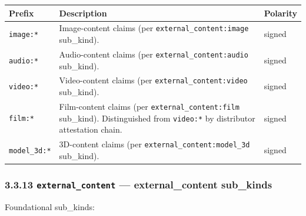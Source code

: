 \documentclass[11pt]{article}
\begin{document}
{\footnotesize
\begin{longtable}{|p{5.33cm}|p{5.33cm}|p{5.33cm}|}\hline
\textbf{Prefix} & \textbf{Description} & \textbf{Polarity} \\ \hline\endhead
\texttt{image:*} & Image-content claims (per \texttt{external\_content:image} sub\_kind). & signed \\ \hline
\texttt{audio:*} & Audio-content claims (per \texttt{external\_content:audio} sub\_kind). & signed \\ \hline
\texttt{video:*} & Video-content claims (per \texttt{external\_content:video} sub\_kind). & signed \\ \hline
\texttt{film:*} & Film-content claims (per \texttt{external\_content:film} sub\_kind). Distinguished from \texttt{video:*} by distributor attestation chain. & signed \\ \hline
\texttt{model\_3d:*} & 3D-content claims (per \texttt{external\_content:model\_3d} sub\_kind). & signed \\ \hline
\end{longtable}}


\subsubsection*{3.3.13 \texttt{external\_content} — external\_content sub\_kinds}


Foundational sub\_kinds:
\end{document}
